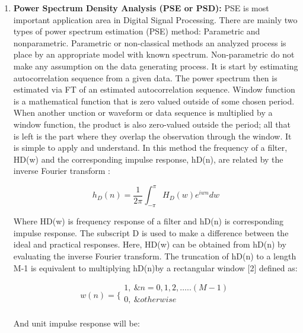 \begin{enumerate}[label=\roman*]
\item \textbf{Power Spectrum Density Analysis (PSE or PSD):} PSE is most important application area in Digital Signal Processing. There are
mainly two types of power spectrum estimation (PSE) method: Parametric and nonparametric. Parametric or non-classical methods an analyzed process is place by an appropriate model with known spectrum. Non-parametric do not make any assumption on the data generating process. It is start by estimating autocorrelation sequence from a given data. The power spectrum then is estimated via FT of an estimated autocorrelation sequence. Window function is a mathematical function that is zero valued outside of some chosen period. When another unction or waveform or data sequence is multiplied by a window function, the product is also zero-valued outside the period; all that is left is the part where they overlap the observation through the window. It is simple to apply and understand. In this method the frequency of a filter, HD(w) and the corresponding impulse response, hD(n), are related by the inverse Fourier transform \cite{cheikhrouhou2018hybrid,khelifi2018localization,choosaksakunwiboon2018pre}:


\begin{equation}\tag{7.13}
h_{D} ( n ) = \frac{1}{2 \pi } \int _{- \pi }^{ \pi }H_{D} ( w ) e^{iwn}dw
\end{equation}
\begin{justify}
Where HD(w) is frequency response of a filter and hD(n) is corresponding impulse response. The subscript D is used to make a difference between the ideal and practical responses. Here, HD(w) can be obtained from hD(n) by evaluating the inverse Fourier transform. The truncation of hD(n) to a length M-1 is equivalent to multiplying hD(n)by a rectangular window [2] defined as:
\end{justify}\par


\begin{equation}\tag{7.14}
w ( n ) = \{ \begin{array}{ll}
	1,~ \&n=0,1,2, \ldots .. ( M-1 ) \\
	0,~ \&otherwise\\
	\end{array}
\end{equation}
\begin{justify}
And unit impulse response will be:
\end{justify}\par



\end{enumerate}

